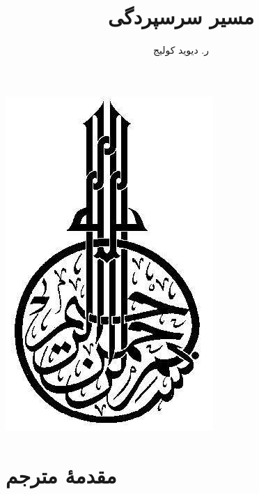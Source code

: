 \documentclass[14pt,oneside]{memoir} %
\title{مسیر سرسپردگی
}
\author{ر. دیوید کولیج
}
\date{}
\begin{document}
  \frontmatter
  

  
\clearpage{}
\thispagestyle{empty} 
\maketitle
\newpage %

  \clearpage{}
\thispagestyle{empty} 
\begin{center}
	\includegraphics[height=0.3\textheight]{besm}
\end{center}
\newpage %

\begin{KeepFromToc}
	\tableofcontents
\end{KeepFromToc}
%
\chapter*{مقدمهٔ مترجم}
 \justify
 


\chapter*{}

  
 \chapter*{}
 
 
\end{document}
